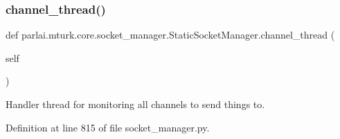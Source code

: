 \subsubsection{\texorpdfstring{channel\+\_\+thread()}{channel\_thread()}}
{\footnotesize\ttfamily def parlai.\+mturk.\+core.\+socket\+\_\+manager.\+Static\+Socket\+Manager.\+channel\+\_\+thread (\begin{DoxyParamCaption}\item[{}]{self }\end{DoxyParamCaption})}

\begin{DoxyVerb}Handler thread for monitoring all channels to send things to.
\end{DoxyVerb}
 

Definition at line 815 of file socket\+\_\+manager.\+py.


